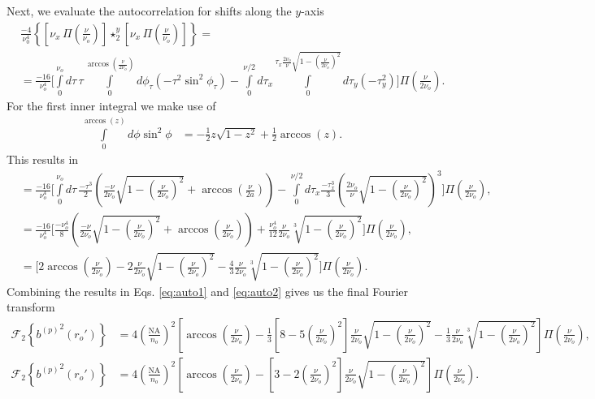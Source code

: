\documentclass[11pt]{article}
\begin{document}
Next, we evaluate the autocorrelation for shifts along the $y$-axis
\begin{align}
  &\frac{-4}{\nu_0^4}\left\{\left[\nu_x\, \Pi\left(\frac{\nu}{\nu_o}\right)\right] \star_2^y \left[\nu_x\, \Pi\left(\frac{\nu}{\nu_o}\right)\right]\right\} = \\
  &=  \frac{-16}{\nu_o^4}\Bigg[\int\limits_0^{\nu_o} d\tau\, \tau \int\limits_0^{\arccos\left(\frac{\nu}{2\nu_o}\right)}d\phi_{\tau}(-\tau^2\sin^2\phi_{\tau}) - \int\limits_0^{\nu/2}d\tau_x \int\limits_0^{\tau_x \frac{2\nu_o}{\nu}\sqrt{1 - \left(\frac{\nu}{2\nu_o}\right)^2}}d\tau_y(-\tau_y^2)\Bigg]\Pi\left(\frac{\nu}{2\nu_o}\right).
\end{align}
For the first inner integral we make use of
\begin{align}
  \int\limits_0^{\arccos(z)} d\phi \sin^2\phi &= -\frac{1}{2}z\sqrt{1 - z^2} + \frac{1}{2}\arccos(z).
\end{align}
This results in
\begin{align}
  &=\frac{-16}{\nu_o^4}\Bigg[\int\limits_0^{\nu_o} d\tau\, \frac{-\tau^3}{2}\left(\frac{-\nu}{2\nu_o}\sqrt{1 - \left(\frac{\nu}{2\nu_o}\right)^2} + \arccos\left(\frac{\nu}{2a}\right)\right) - \int\limits_0^{\nu/2}d\tau_x \frac{-\tau_x^3}{3}\left(\frac{2 \nu_o}{\nu}\sqrt{1 - \left(\frac{\nu}{2\nu_o}\right)^2}\right)^3\Bigg]\Pi\left(\frac{\nu}{2\nu_o}\right),\\
  &=  \frac{-16}{\nu_o^4}\Bigg[\frac{-\nu_o^4}{8}\left(\frac{-\nu}{2\nu_o}\sqrt{1 - \left(\frac{\nu}{2\nu_o}\right)^2} + \arccos\left(\frac{\nu}{2\nu_o}\right) \right) + \frac{\nu_o^4}{12}\frac{\nu}{2\nu_o}\sqrt[3]{1 - \left(\frac{\nu}{2\nu_o}\right)^2}\Bigg]\Pi\left(\frac{\nu}{2\nu_o}\right),\\
  &=  \Bigg[2\arccos\left(\frac{\nu}{2\nu_o}\right) - 2\frac{\nu}{2\nu_o}\sqrt{1 - \left(\frac{\nu}{2\nu_o}\right)^2} - \frac{4}{3}\frac{\nu}{2\nu_o}\sqrt[3]{1 - \left(\frac{\nu}{2\nu_o}\right)^2}\Bigg]\Pi\left(\frac{\nu}{2\nu_o}\right). \label{eq:auto2}
\end{align}
Combining the results in Eqs. \ref{eq:auto1} and \ref{eq:auto2} gives us the final Fourier transform
\begin{align}
  \mathcal{F}_2\left\{{b^{(p)}}^2(r_o')\right\} &= 4\left(\frac{\text{NA}}{n_o}\right)^2\left[\arccos\left(\frac{\nu}{2\nu_o}\right) - \frac{1}{3}\left[8 - 5\left(\frac{\nu}{2\nu_o}\right)^2\right]\frac{\nu}{2\nu_o} \sqrt{1 - \left(\frac{\nu}{2\nu_o}\right)^2} - \frac{1}{3}\frac{\nu}{2\nu_o}\sqrt[3]{1 - \left(\frac{\nu}{2\nu_o}\right)^2}\right]\Pi\left(\frac{\nu}{2\nu_o}\right),\\
    \mathcal{F}_2\left\{{b^{(p)}}^2(r_o')\right\} &= 4\left(\frac{\text{NA}}{n_o}\right)^2\left[\arccos\left(\frac{\nu}{2\nu_o}\right) - \left[3 - 2\left(\frac{\nu}{2\nu_o}\right)^2\right]\frac{\nu}{2\nu_o} \sqrt{1 - \left(\frac{\nu}{2\nu_o}\right)^2}\right]\Pi\left(\frac{\nu}{2\nu_o}\right).
\end{align}
\end{document}
